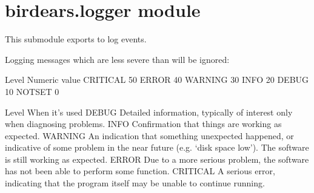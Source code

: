 \documentclass[letterpaper,10pt,english]{sphinxmanual}
\begin{document}

\begin{fulllineitems}
\label{\detokenize{birdears:birdears.interval.get_interval_by_semitones}}
\end{fulllineitems}



\section{birdears.logger module}
\label{\detokenize{birdears:module-birdears.logger}}\label{\detokenize{birdears:birdears-logger-module}}
This submodule exports  to log events.

Logging messages which are less severe than  will be ignored:

\begin{sphinxVerbatim}[commandchars=\\\{\}]
Level       Numeric value
\PYGZhy{}\PYGZhy{}\PYGZhy{}\PYGZhy{}\PYGZhy{}       \PYGZhy{}\PYGZhy{}\PYGZhy{}\PYGZhy{}\PYGZhy{}\PYGZhy{}\PYGZhy{}\PYGZhy{}\PYGZhy{}\PYGZhy{}\PYGZhy{}\PYGZhy{}\PYGZhy{}
CRITICAL    50
ERROR       40
WARNING     30
INFO        20
DEBUG       10
NOTSET      0

Level       When it’s used
\PYGZhy{}\PYGZhy{}\PYGZhy{}\PYGZhy{}\PYGZhy{}       \PYGZhy{}\PYGZhy{}\PYGZhy{}\PYGZhy{}\PYGZhy{}\PYGZhy{}\PYGZhy{}\PYGZhy{}\PYGZhy{}\PYGZhy{}\PYGZhy{}\PYGZhy{}\PYGZhy{}\PYGZhy{}
DEBUG       Detailed information, typically of interest only when
                diagnosing problems.
INFO        Confirmation that things are working as expected.
WARNING     An indication that something unexpected happened, or indicative
                of some problem in the near future (e.g. ‘disk space low’).
                The software is still working as expected.
ERROR       Due to a more serious problem, the software has not been able
                to perform some function.
CRITICAL    A serious error, indicating that the program itself may be
                unable to continue running.
\end{sphinxVerbatim}
\end{document}
